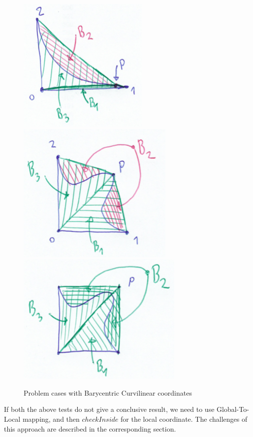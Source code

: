\begin{figure}[!htb]
    \centering	
    \includegraphics[scale=0.7]{doc-pics/pic-barycentric-problem-1.png}
    \includegraphics[scale=0.7]{doc-pics/pic-barycentric-problem-2.png}
    \includegraphics[scale=0.7]{doc-pics/pic-barycentric-problem-3.png}
    \caption{Problem cases with Barycentric Curvilinear coordinates}
\end{figure}

\noindent
If both the above tests do not give a conclusive result, we need to use Global-To-Local mapping, and then $checkInside$ for the local coordinate. The challenges of this approach are described in the corresponding section. \\

